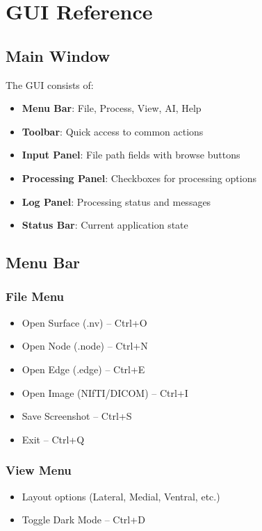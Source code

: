\documentclass[11pt,a4paper]{article}
\begin{document}
\section{GUI Reference}

\subsection{Main Window}

The GUI consists of:
\begin{itemize}
    \item \textbf{Menu Bar}: File, Process, View, AI, Help
    \item \textbf{Toolbar}: Quick access to common actions
    \item \textbf{Input Panel}: File path fields with browse buttons
    \item \textbf{Processing Panel}: Checkboxes for processing options
    \item \textbf{Log Panel}: Processing status and messages
    \item \textbf{Status Bar}: Current application state
\end{itemize}

\subsection{Menu Bar}

\subsubsection{File Menu}
\begin{itemize}
    \item Open Surface (.nv) -- Ctrl+O
    \item Open Node (.node) -- Ctrl+N
    \item Open Edge (.edge) -- Ctrl+E
    \item Open Image (NIfTI/DICOM) -- Ctrl+I
    \item Save Screenshot -- Ctrl+S
    \item Exit -- Ctrl+Q
\end{itemize}

\subsubsection{View Menu}
\begin{itemize}
    \item Layout options (Lateral, Medial, Ventral, etc.)
    \item Toggle Dark Mode -- Ctrl+D
\end{itemize}
\end{document}
